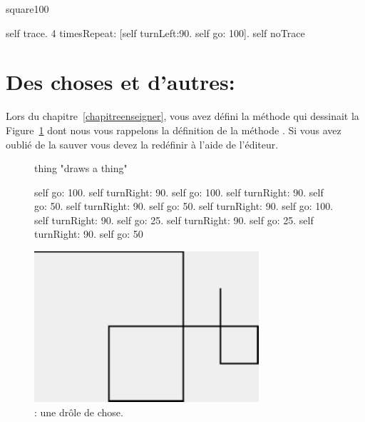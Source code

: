 \begin{nmethode}
square100
        
   self trace. 
   4 timesRepeat: [self turnLeft:90. 
                  self go: 100].
   self noTrace
\end{nmethode}



\section{Des choses et d'autres: }
Lors du chapitre~\ref{chapitreenseigner}, vous avez d\'efini la
m\'ethode  qui dessinait la Figure~\ref{c7thing} dont nous
vous rappelons la d\'efinition de la m\'ethode
. Si vous avez oubli\'e de la sauver vous devez la
red\'efinir \`a l'aide de l'\'editeur.

\begin{figure}[!htbp]
\begin{minipage}[c]{.55\linewidth}
\begin{nmethode}
thing
   "draws a thing"

   self go: 100.
   self turnRight: 90.
   self go: 100.
   self turnRight: 90.
   self go: 50.
   self turnRight: 90.
   self go: 50.
   self turnRight: 90.
   self go: 100.
   self turnRight: 90.
   self go: 25.
   self turnRight: 90.
   self go: 25.
   self turnRight: 90.
   self go: 50
\end{nmethode}
\end{minipage}
\begin{minipage}[c]{.45\linewidth}
\centerline{\includegraphics[width=\linewidth]{c6thing}}
\end{minipage}
\caption{ : une dr\^ole de chose.}
\label{c7thing}
\end{figure}

